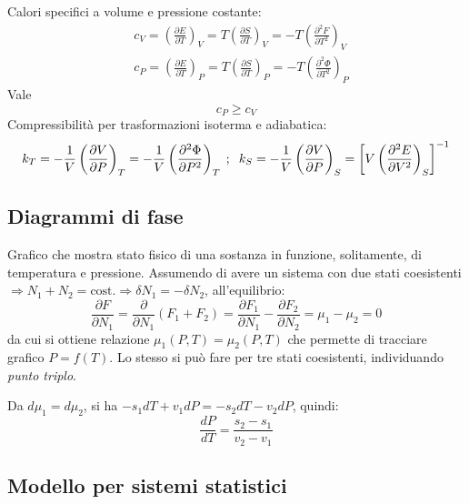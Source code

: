 \documentclass[10pt, a4paper]{scrartcl}
\numberwithin{equation}{subsection}
\theoremstyle{style1}
\theoremstyle{style2}
\begin{document}
Calori specifici a volume e pressione costante:
\begin{equation}
	\begin{split}
		&c_V = \left(\frac{\partial E}{\partial T} \right) _V = T \left(\frac{\partial S}{\partial T} \right) _V = -T \left(\frac{\partial ^2 F}{\partial T^2} \right) _V \\
		&c_P = \left(\frac{\partial E}{\partial T} \right) _P = T \left(\frac{\partial S}{\partial T} \right) _P = -T \left(\frac{\partial ^2 \Phi}{\partial T^2} \right) _P
	\end{split}
\end{equation}
Vale
\begin{equation}
	c_P \ge  c_V
\end{equation}
Compressibilit\`a per trasformazioni isoterma e adiabatica:
\begin{equation}
	k_T = -\frac{1}{V} \left(\frac{\partial V}{\partial P} \right) _T=-\frac{1}{V}\left(\frac{\partial ^2\Phi}{\partial P^2} \right) _T \hspace{.1cm} ; \hspace{.2cm} k_S = -\frac{1}{V } \left(\frac{\partial V}{\partial P} \right) _S = \left[ V \left(\frac{\partial ^2E}{\partial V^2} \right) _S \right] ^{-1} 
\end{equation}
\subsection{Diagrammi di fase}
Grafico che mostra stato fisico di una sostanza in funzione, solitamente, di temperatura e pressione. Assumendo di avere un sistema con due stati coesistenti $\Rightarrow N_1+N_2 = \text{cost.}\Rightarrow \delta N_1 = - \delta N_2$, all'equilibrio:
\[
\frac{\partial F}{\partial N_1} = \frac{\partial }{\partial N_1} (F_1+F_2) = \frac{\partial F_1}{\partial N_1} -\frac{\partial F_2}{\partial N_2} = \mu_1-\mu_2 = 0
\] 
da cui si ottiene relazione $\mu _1 (P,T) = \mu _2(P,T)$ che permette di tracciare grafico $P=f(T)$. Lo stesso si pu\`o fare per tre stati coesistenti, individuando \textit{punto triplo}. 

Da $d\mu_1 = d \mu _2$, si ha $-s_1 dT + v_1 dP = -s_2 dT - v_2dP$, quindi:
\begin{equation}
	\frac{d P}{d T} = \frac{s_2-s_1}{v_2-v_1}
\end{equation}
\subsection{Modello per sistemi statistici}
\end{document}

